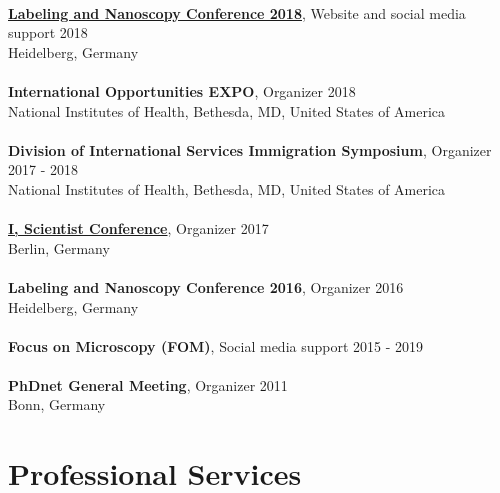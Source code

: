 \documentclass[margin,line]{res}
\begin{document}
\begin{resume}
\vspace*{-3mm}\\
{\bf \href{https://labeling-and-nanoscopy.de/}{Labeling and Nanoscopy Conference 2018}}, Website and social media support \hfill {2018}\\
Heidelberg, Germany\\
\vspace*{-3mm}\\
{\bf International Opportunities EXPO}, Organizer \hfill {2018}\\
National Institutes of Health, Bethesda, MD, United States of America\\
\vspace*{-3mm}\\
{\bf Division of International Services Immigration Symposium}, Organizer  \hfill {2017 - 2018}\\
National Institutes of Health, Bethesda, MD, United States of America\\
\vspace*{-3mm}\\
{\bf \href{https://www.iscientist.berlin/}{I, Scientist Conference}},  Organizer \hfill {2017}\\
Berlin, Germany\\
\vspace*{-3mm}\\
{\bf Labeling and Nanoscopy Conference 2016}, Organizer \hfill {2016}\\
Heidelberg, Germany\\
\vspace*{-3mm}\\
{\bf Focus on Microscopy (FOM)}, Social media support \hfill {2015 - 2019}\\
\vspace*{-3mm}\\
{\bf PhDnet General Meeting}, Organizer \hfill {2011}\\
Bonn, Germany


\section{\sc Professional Services}


\end{resume}
\end{document}
